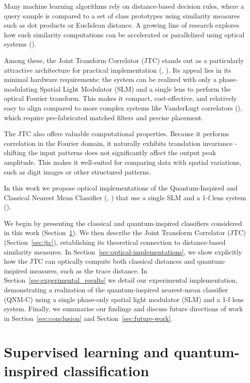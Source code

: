 \documentclass[twocolumn]{article} %
\begin{document}
Many machine learning algorithms rely on distance-based decision rules, where a query sample is compared to a set of class prototypes using similarity measures such as dot products or Euclidean distance. A growing line of research explores how such similarity computations can be accelerated or parallelized using optical systems (\cite{Dragulinescu2023}).

Among these, the Joint Transform Correlator (JTC) stands out as a particularly attractive architecture for practical implementation (\cite{Javidi1989}, \cite{Psaltis1984}). Its appeal lies in its minimal hardware requirements: the system can be realized with only a phase-modulating Spatial Light Modulator (SLM) and a single lens to perform the optical Fourier transform. This makes it compact, cost-effective, and relatively easy to align compared to more complex systems like VanderLugt correlators (\cite{VanderLugt1964}), which require pre-fabricated matched filters and precise placement.

The JTC also offers valuable computational properties. Because it performs correlation in the Fourier domain, it naturally exhibits translation invariance - shifting the input patterns does not significantly affect the output peak amplitude. This makes it well-suited for comparing data with spatial variations, such as digit images or other structured patterns.

In this work we propose optical implementations of the Quantum-Inspired and Classical Nearest Mean Classifier (\cite{Sergioli2025}, \cite{Cruzeiro2024}) that use a single SLM and a 1-f lens system (\cite{Javidi1989}).  

We begin by presenting the classical and quantum-inspired classifiers considered in this work (Section~\ref{sec:ml-qic}). We then describe the Joint Transform Correlator (JTC) (Section~\ref{sec:jtc}), establishing its theoretical connection to distance-based similarity measures. In Section~\ref{sec:optical-implementations}, we show explicitly how the JTC can optically compute both classical distances and quantum-inspired measures, such as the trace distance. 
In Section~\ref{sec:experimental_results} we detail our experimental implementation, demonstrating a realization of the quantum-inspired nearest-mean classifier (QNM-C) using a single phase-only spatial light modulator (SLM) and a 1-f lens system. Finally, we summarise our findings and discuss future directions of work in Section~\ref{sec:conclusion} and Section~\ref{sec:future-work}.

\section{Supervised learning and quantum-inspired classification}
\label{sec:ml-qic}
\end{document}
